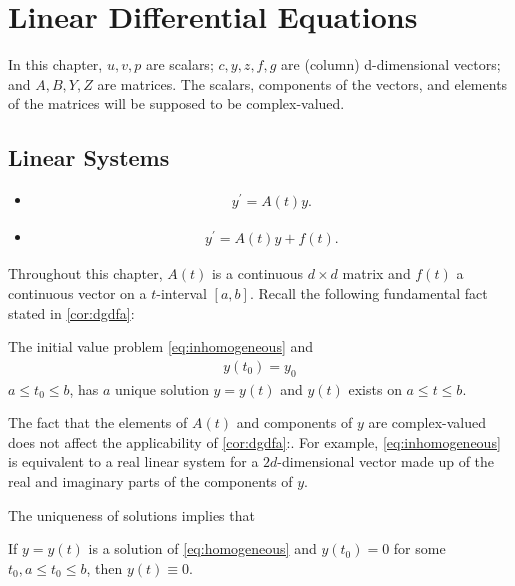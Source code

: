 \documentclass{article}
\begin{document}
\section{Linear Differential Equations}
In this chapter, $u, v, p$ are scalars; $c, y, z, f, g$ are (column) d-dimensional vectors; and $A, B, Y, Z$ are matrices. The scalars, components of the vectors, and elements of the matrices will be supposed to be complex-valued.
\subsection{Linear Systems}
\begin{itemize}
    \item {} 
    \begin{align}
y^{\prime}=A(t) y. \label{eq:homogeneous}
\end{align}
\item {}
\begin{align}
y^{\prime}=A(t) y+f(t). \label{eq:inhomogeneous}
\end{align}
\end{itemize}

Throughout this chapter, $A(t)$ is a continuous $d \times d$ matrix and $f(t)$ a continuous vector on a $t$-interval $[a, b]$. Recall the following fundamental fact stated in \cref{cor:dgdfa}:
\begin{lema}
The initial value problem \cref{eq:inhomogeneous} and
\begin{align}
y\left(t_{0}\right)=y_{0} \label{eq:initpoint}
\end{align}
$a \le t_{0} \le b$, has $a$ unique solution $y=y(t)$ and $y(t)$ exists on $a \le t \le b .$ 
\end{lema} 
\begin{rema}
The fact that the elements of $A(t)$ and components of $y$ are complex-valued does not affect the applicability of \cref{cor:dgdfa}:. For example, \cref{eq:inhomogeneous} is equivalent to a real linear system for a $2 d$-dimensional vector made up of the real and imaginary parts of the components of $y$. 
\end{rema}
The uniqueness of solutions  implies that 
\begin{cora}\label{eq:cadf}
If $y=y(t)$ is a solution of \cref{eq:homogeneous} and $y\left(t_{0}\right)=0$ for some $t_{0}, a \le t_{0} \le b$, then $y(t) \equiv 0$.
\end{cora} 
\end{document}
